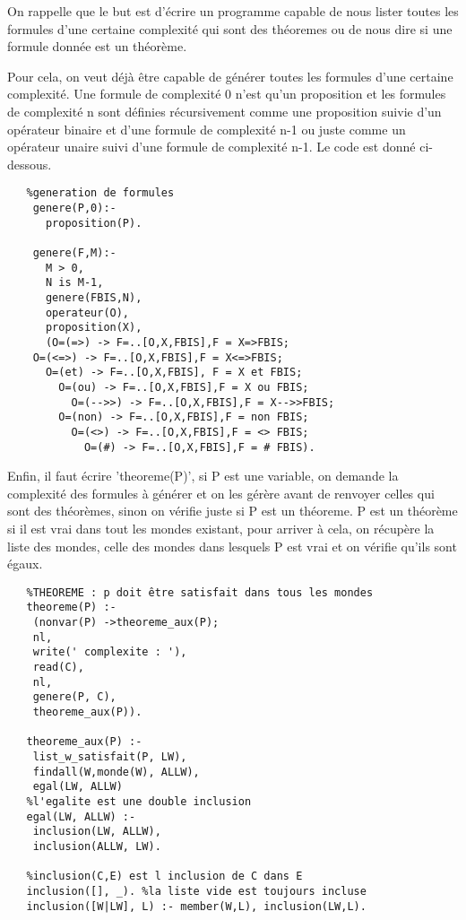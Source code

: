 \documentclass[a4paper,10pt]{article}
\begin{document}
   On rappelle que le but est d'\'{e}crire un programme capable de nous lister toutes les formules d'une certaine complexit\'{e} qui sont des th\'{e}oremes ou de nous
   dire si une formule donn\'{e}e est un th\'{e}or\`{e}me.
   
   Pour cela, on veut d\'{e}j\`{a} \^{e}tre capable de g\'{e}n\'{e}rer toutes les formules d'une certaine complexit\'{e}. Une formule de complexit\'{e} 0 n'est qu'un
   proposition et les formules de complexit\'{e} n sont d\'{e}finies r\'{e}cursivement comme une proposition suivie d'un op\'{e}rateur binaire et d'une formule de
   complexit\'{e} n-1 ou juste comme un op\'{e}rateur unaire suivi d'une formule de complexit\'{e} n-1. Le code est donn\'{e} ci-dessous.
   
   \begin{lstlisting}
   %generation de formules
    genere(P,0):-
      proposition(P).

    genere(F,M):-
      M > 0,
      N is M-1,
      genere(FBIS,N),
      operateur(O),
      proposition(X),
      (O=(=>) -> F=..[O,X,FBIS],F = X=>FBIS;
	O=(<=>) -> F=..[O,X,FBIS],F = X<=>FBIS;
	  O=(et) -> F=..[O,X,FBIS], F = X et FBIS;
	    O=(ou) -> F=..[O,X,FBIS],F = X ou FBIS;
	      O=(-->>) -> F=..[O,X,FBIS],F = X-->>FBIS;
		O=(non) -> F=..[O,X,FBIS],F = non FBIS;
		  O=(<>) -> F=..[O,X,FBIS],F = <> FBIS;
		    O=(#) -> F=..[O,X,FBIS],F = # FBIS).
   \end{lstlisting}
   
   Enfin, il faut \'{e}crire 'theoreme(P)', si P est une variable, on demande la complexit\'{e} des formules \`{a} g\'{e}n\'{e}rer et on les g\'{e}r\`{e}re
   avant de renvoyer celles qui sont des th\'{e}or\`{e}mes, sinon on v\'{e}rifie juste si P est un th\'{e}oreme. P est un th\'{e}or\`{e}me si il est vrai
   dans tout les mondes existant, pour arriver \`{a} cela, on r\'{e}cup\`{e}re la liste des mondes, celle des mondes dans lesquels P est vrai et on v\'{e}rifie
   qu'ils sont \'{e}gaux.
   
   \begin{lstlisting}
   %THEOREME : p doit être satisfait dans tous les mondes
   theoreme(P) :-
	(nonvar(P) ->theoreme_aux(P);
	nl,
	write(' complexite : '),
	read(C),
	nl,
	genere(P, C),
	theoreme_aux(P)).

   theoreme_aux(P) :-
	list_w_satisfait(P, LW),
	findall(W,monde(W), ALLW),
	egal(LW, ALLW)
   %l'egalite est une double inclusion
   egal(LW, ALLW) :-
	inclusion(LW, ALLW),
	inclusion(ALLW, LW).

   %inclusion(C,E) est l inclusion de C dans E
   inclusion([], _). %la liste vide est toujours incluse
   inclusion([W|LW], L) :- member(W,L), inclusion(LW,L).
   \end{lstlisting}
   
\end{document}
